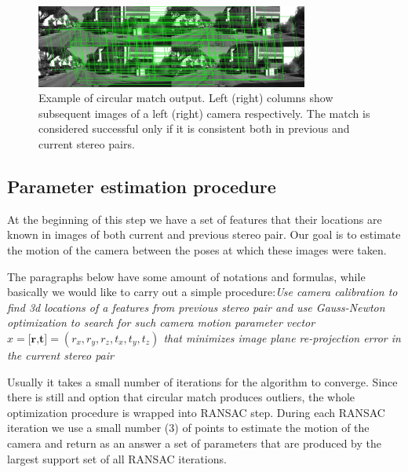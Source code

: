 \documentclass[10pt]{article}         %
\begin{document}
\begin{figure}[h]
    \centering
    \includegraphics[width=0.8\textwidth]{circles}
    \caption{Example of circular match output. Left (right) columns show subsequent images of a left (right) camera respectively.  The match is considered successful only if it is consistent both in previous and current stereo pairs.}
    \label{fig:circle}
\end{figure}

\subsection{Parameter estimation procedure}

At the beginning of this step we have a set of features that their locations are known in images of both current and previous stereo pair.  Our goal is to estimate the motion of the camera between the poses at which these images were taken.  

The paragraphs below have some amount of notations and formulas, while basically we would like to carry out a simple procedure:\emph{Use camera calibration to find 3d locations of a features from previous stereo pair and use Gauss-Newton optimization to search for such camera motion parameter vector $x=\textbf{[r,t]}=(r_x,r_y,r_z,t_x,t_y,t_z)$ that minimizes image plane re-projection error in the current stereo pair}

Usually it takes a small number of iterations for the algorithm to converge.  Since there is still and option that circular match produces outliers, the whole optimization procedure is wrapped into RANSAC step.  During each RANSAC iteration we use a small number (3) of points to estimate the motion of the camera and return as an answer a set of parameters that are produced by the largest support set of all RANSAC iterations.
\end{document}
